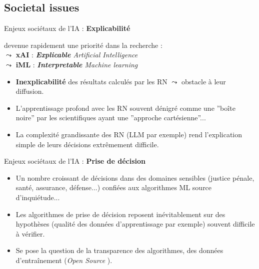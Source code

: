\documentclass[11pt,serif,mathserif,compress,hyperref={colorlinks}]{beamer}
\begin{document}
\subsection{Societal issues}

\begin{frame}{Enjeux sociétaux de l'IA : {\bf Explicabilité}}

  devenue rapidement une priorité dans la recherche : \\
  $\leadsto$ {\bf xAI} : {\em {\bf Explicable} Artificial Intelligence} \\
  $\leadsto$ {\bf iML} : {\em {\bf Interpretable} Machine learning} \smallskip

  \begin{tcolorbox}[title={\bf Explicabilité} des Réseaux de Neurones (RN)]
    \begin{itemize}
    \item {\bf Inexplicabilité} des résultats calculés par les RN $\leadsto$ obstacle à leur diffusion.
    \item L'apprentissage profond avec les RN souvent dénigré comme une ''boîte noire'' par les scientifiques ayant une ''approche cartésienne''...
    \item La complexité grandissante des RN (LLM par exemple) rend l'explication simple de leurs décisions extrêmement difficile.
    \end{itemize}
  \end{tcolorbox}   
    
\end{frame}

\begin{frame}{Enjeux sociétaux de l'IA : {\bf Prise de décision}}
  
  \begin{tcolorbox}[title={\bf Prise de décision}]
    \begin{itemize}
    \item Un nombre croissant de décisions dans des domaines sensibles (justice pénale, santé, assurance, défense...)
      confiées aux algorithmes ML source d'inquiétude...
    \item Les algorithmes de prise de décision reposent inévitablement sur des hypothèses
      (qualité des données d'apprentissage par exemple) souvent difficile à vérifier.
    \item Se pose la question de la transparence des algorithmes, des données d'entraînement ({\em Open Source} ).
    \end{itemize}
  \end{tcolorbox}   
    
\end{frame}
\end{document}

